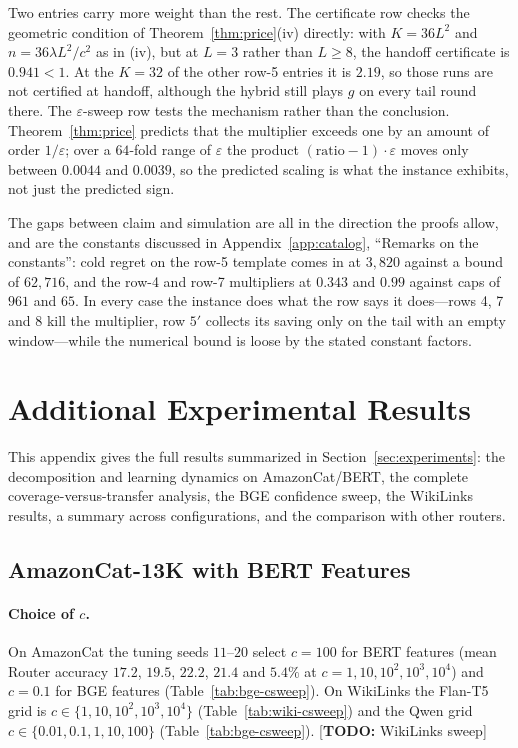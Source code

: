 \documentclass{article}
\theoremstyle{definition}
\theoremstyle{remark}
\newcommand{\eps}{\varepsilon}
\theoremstyle{remark}
\newcommand{\todo}[1]{\textcolor{red!70!black}{[\textbf{TODO:} #1]}}
\begin{document}
Two entries carry more weight than the rest. The certificate row checks the
geometric condition of Theorem~\ref{thm:price}(iv) directly: with $K=36L^2$
and $n=36\lambda L^2/c^2$ as in (iv), but at $L=3$ rather than $L\ge8$, the
handoff certificate is $0.941<1$. At the $K=32$ of the other row-5 entries it
is $2.19$, so those runs are not certified at handoff, although the hybrid
still plays $g$ on every tail round there. The $\eps$-sweep row tests the
mechanism rather than the conclusion. Theorem~\ref{thm:price} predicts that
the multiplier exceeds one by an amount of order $1/\eps$; over a $64$-fold
range of $\eps$ the product $(\text{ratio}-1)\cdot\eps$ moves only between
$0.0044$ and $0.0039$, so the predicted scaling is what the instance exhibits,
not just the predicted sign.

The gaps between claim and simulation are all in the direction the proofs
allow, and are the constants discussed in
Appendix~\ref{app:catalog}, ``Remarks on the constants'': cold regret on the
row-5 template comes in at $3{,}820$ against a bound of $62{,}716$, and the
row-4 and row-7 multipliers at $0.343$ and $0.99$ against caps of $961$ and
$65$. In every case the instance does what the row says it does---rows 4, 7
and 8 kill the multiplier, row $5'$ collects its saving only on the tail with
an empty window---while the numerical bound is loose by the stated constant
factors.

\section{Additional Experimental Results}
\label{app:more-exp}

This appendix gives the full results summarized in Section~\ref{sec:experiments}:
the decomposition and learning dynamics on AmazonCat/BERT, the complete
coverage-versus-transfer analysis, the BGE confidence sweep, the WikiLinks
results, a summary across configurations, and the comparison with other
routers.

\subsection{AmazonCat-13K with BERT Features}
\label{app:amazon-bert}

\paragraph{Choice of $c$.} On AmazonCat the tuning seeds $11$--$20$ select
$c=100$ for BERT features (mean Router accuracy $17.2$, $19.5$, $22.2$, $21.4$
and $5.4\%$ at $c=1,10,10^2,10^3,10^4$) and $c=0.1$ for BGE features
(Table~\ref{tab:bge-csweep}). On WikiLinks the Flan-T5 grid is
$c\in\{1,10,10^2,10^3,10^4\}$ (Table~\ref{tab:wiki-csweep}) and the Qwen grid
$c\in\{0.01,0.1,1,10,100\}$ (Table~\ref{tab:bge-csweep}).
\todo{WikiLinks sweep}
\end{document}
